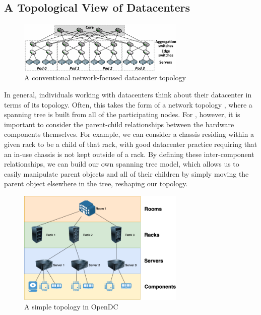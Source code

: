 \documentclass[11pt]{article}
\begin{document}
	\subsection{A Topological View of Datacenters}
		\begin{figure}[ht!]
			\centering
			\includegraphics[width=8cm]{couto2012/Fat-tree-with-4-port-switches-n-4.png}
			\caption[A conventional network-focused datacenter topology]{A conventional network-focused datacenter topology \cite{Couto2012}}
			\label{fig:networktopology}
		\end{figure}
		In general, individuals working with datacenters think about their datacenter in terms of its topology. 
		Often, this takes the form of a network topology \cite{Couto2012}, where a spanning tree is built from all of the participating nodes. 
		For \opendc{}, however, it is important to consider the parent-child relationships between the hardware components themselves. 
		For example, we can consider a chassis residing within a given rack to be a child of that rack, with good datacenter practice requiring that an in-use chassis is not kept outside of a rack.
		By defining these inter-component relationships, we can build our own spanning tree model, which allows us to easily manipulate parent objects and all of their children by simply moving the parent object elsewhere in the tree, reshaping our topology.
		\begin{figure}[ht!]
			\centering
			\includegraphics[width=8cm]{opendc-topology.png}
			\caption[A simple topology in OpenDC]{A simple topology in OpenDC}
			\label{fig:example-opendc-topology}
		\end{figure}
\end{document}
